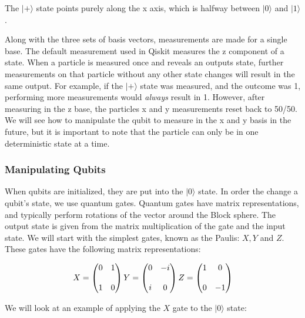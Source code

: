 \documentclass[11pt]{article}
\begin{document}
    The \(|+\rangle\) state points purely along the x axis, which is halfway
between \(|0\rangle\) and \(|1\rangle\).

    Along with the three sets of basis vectors, measurements are made for a
single base. The default measurement used in Qiskit measures the z
component of a state. When a particle is measured once and reveals an
outputs state, further measurements on that particle without any other
state changes will result in the same output. For example, if the
\(|+\rangle\) state was measured, and the outcome was 1, performing more
measurements would \emph{always} result in 1. However, after measuring
in the z base, the particles x and y measurements reset back to 50/50.
We will see how to manipulate the qubit to measure in the x and y basis
in the future, but it is important to note that the particle can only be
in one deterministic state at a time.

    \subsubsection{Manipulating Qubits}\label{manipulating-qubits}

    When qubits are initialized, they are put into the \(|0\rangle\) state.
In order the change a qubit's state, we use quantum gates. Quantum gates
have matrix representations, and typically perform rotations of the
vector around the Block sphere. The output state is given from the
matrix multiplication of the gate and the input state. We will start
with the simplest gates, known as the Paulis: \(X, Y\) and \(Z\). These
gates have the following matrix representations:

\[
X= \begin{pmatrix} 0&1 \\\\ 1&0 \end{pmatrix}\\\\
Y= \begin{pmatrix} 0&-i \\\\ i&0 \end{pmatrix}\\\\
Z= \begin{pmatrix} 1&0 \\\\ 0&-1 \end{pmatrix}
\]

We will look at an example of applying the \(X\) gate to the
\(|0\rangle\) state:
\end{document}
